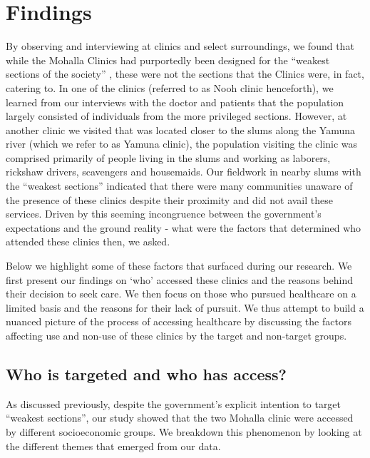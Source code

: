 \section{Findings}%
By observing and interviewing at clinics and select surroundings, we found that while the Mohalla Clinics had purportedly been designed for the ``weakest sections of the society'' \cite{AAPpressrelease}, these were not the sections that the Clinics were, in fact, catering to. In one of the clinics (referred to as Nooh
 clinic henceforth), we learned from our interviews with the doctor and patients that the population largely consisted of individuals from the more privileged sections. However, at another clinic we visited that was located closer to the slums along the Yamuna river (which we refer to as Yamuna clinic), the population visiting the clinic was comprised primarily of people living in the slums and working as laborers, rickshaw drivers, scavengers and housemaids. Our fieldwork in nearby slums with the ``weakest sections'' indicated that there were many communities unaware of the presence of these clinics despite their proximity and did not avail these services. Driven %
 by this seeming incongruence between the government's expectations and the ground reality - what were the factors that determined who attended these clinics then, we asked.%

Below we highlight some of these factors that surfaced during our research. We first present our findings on `who' accessed these clinics and the reasons behind their decision to seek care. We then focus on those who pursued healthcare on a limited basis and the reasons for their lack of pursuit. We thus attempt to build a nuanced picture of the process of accessing healthcare by discussing the factors affecting use and non-use of these clinics by the target and non-target groups.
\subsection{Who is targeted and who has access?}

As discussed previously, despite the government's explicit intention to target ``weakest sections'', our study showed that the two Mohalla clinic were accessed by different socioeconomic groups. We breakdown this phenomenon by looking at the  different themes that emerged from our data.

